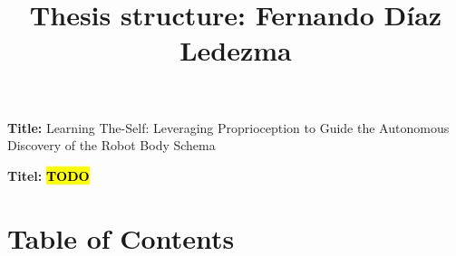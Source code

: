 \documentclass[12pt, a4paper]{article}
\title{Thesis structure: Fernando Díaz Ledezma}
\author{}
\date{}
\newcommand{\namelistlabel}[1]{\mbox{#1}	\hfil}
\newcommand{\TODO}{\hl{\textbf{TODO}}}
\newenvironment{namelist}[1]{%
\begin{list}{}
    {
        \let\makelabel\namelistlabel
        \settowidth{\labelwidth}{#1}
        \setlength{\leftmargin}{1.1\labelwidth}
    }
  }{%
\end{list}}
\begin{document}
\maketitle

\begin{namelist}{xxxxxxxxxxxx}
\item[{\bf Title:}]
	Learning The-Self: Leveraging Proprioception to Guide the Autonomous Discovery of the Robot Body Schema

\item[{\bf Titel:}]
\TODO
\end{namelist}

\section*{Table of Contents}

    
    
\end{document}

